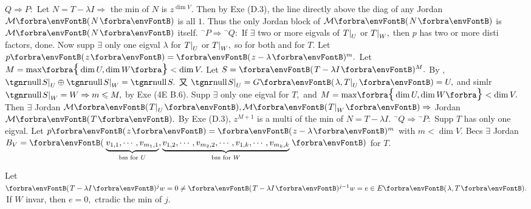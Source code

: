 $Q\Rightarrow P:$ \;Let $N=T-\lambda I\Rightarrow$ the min of $N$ is $z^{\dim V}.$\parSol{}
Then by Exe (D.3), the line directly above the diag of any Jordan $\Mt{N}$ is all $1.$\parSol{}
Thus the only Jordan block of $\Mt{N}$ is $\Mt{N}$ itself.\vspace{3pt}\parSol{}
${}{^\neg}P\Rightarrow{}{^\neg}Q:$ \;If $\exists$ two or more eigvals of $T\text{\normalsize|}_U$ or $T\text{\normalsize|}_W,$ then $p$ has two or more disti factors, done.\parSol{}
Now supp $\exists$ only one eigval $\lambda$ for $T\text{\normalsize|}_U$ or $T\text{\normalsize|}_W,$ so for both and for $T.$\parSol{}
Let $p\Par{z}=\Par{z-\lambda}{^m}.$ Let $M=\max\!\Bra{\dim U,\dim W}<\dim V.$\parSol{}
Let $S=\Par{T-\lambda I}{^M}.$ By , $\null S\mmid_U\oplus\null S\mmid_W=\null S.$\parSol{}
又 $\null S\mmid_U=G\Par{\lambda,T\mmid_U}=U,$ and simlr $\null S\mmid_W=W\Rightarrow m\leqslant M,$ by Exe (4E B.6).\vspace{2pt}\parSol{}
\Or Supp $\exists$ only one eigval for $T,$ and $M=\max\!\Bra{\dim U,\dim W}<\dim V.$\parSol{}
Then $\exists$ Jordan $\Mt{T\mmid_U},\Mt{T\mmid_W}\Rightarrow$ Jordan $\Mt{T}.$\parSol{}
By Exe (D.3), $z^{M+1}$ is a multi of the min of $N=T-\lambda I.$\vspace{4pt}\parSol{}
${}{^\neg}Q\Rightarrow{}{^\neg}P:$ \;Supp $T$ has only one eigval. Let
$p\Par{z}=\Par{z-\lambda}{^m}$ with $m<\dim V.$\parSol{}
Becs $\exists$ Jordan $B_V=\Par{\underbrace{v_{1,1},\cdots,v_{m_1,1}}_{\text{bss for } U},\underbrace{v_{1,2},\cdots,v_{m_2,2},\cdots,v_{1,k},\cdots,v_{m_k,k}}_{\text{bss for }W}}$ for $T.$\PfEnd\vspace{4pt}
\SepLine

Let $\Par{T-\lambda I}{^j}w=0\neq\Par{T-\lambda I}{^{j-1}}w=e\in E\Par{\lambda,T}.$ \,If $W$ invar, then $e=0,$ ctradic the min of $j.$\PfEnd
\SepLine


